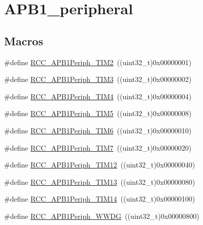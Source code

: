 \hypertarget{group___a_p_b1__peripheral}{}\section{A\+P\+B1\+\_\+peripheral}
\label{group___a_p_b1__peripheral}
\subsection*{Macros}
\begin{DoxyCompactItemize}
\item 
\#define \mbox{\hyperlink{group___a_p_b1__peripheral_ga742bab2f04cebe587574b53f7107aeaf}{R\+C\+C\+\_\+\+A\+P\+B1\+Periph\+\_\+\+T\+I\+M2}}~((uint32\+\_\+t)0x00000001)
\item 
\#define \mbox{\hyperlink{group___a_p_b1__peripheral_gad4454f63a511a256e55aad55c03beb76}{R\+C\+C\+\_\+\+A\+P\+B1\+Periph\+\_\+\+T\+I\+M3}}~((uint32\+\_\+t)0x00000002)
\item 
\#define \mbox{\hyperlink{group___a_p_b1__peripheral_ga80f9f3720804a97210b723696bd94d83}{R\+C\+C\+\_\+\+A\+P\+B1\+Periph\+\_\+\+T\+I\+M4}}~((uint32\+\_\+t)0x00000004)
\item 
\#define \mbox{\hyperlink{group___a_p_b1__peripheral_ga4905c26000a571fa01fc057fe31d254a}{R\+C\+C\+\_\+\+A\+P\+B1\+Periph\+\_\+\+T\+I\+M5}}~((uint32\+\_\+t)0x00000008)
\item 
\#define \mbox{\hyperlink{group___a_p_b1__peripheral_ga4974e8b8f11d54fbc0bac1988ff6254c}{R\+C\+C\+\_\+\+A\+P\+B1\+Periph\+\_\+\+T\+I\+M6}}~((uint32\+\_\+t)0x00000010)
\item 
\#define \mbox{\hyperlink{group___a_p_b1__peripheral_ga9415b0c46db5318bdee3f868c16b8d35}{R\+C\+C\+\_\+\+A\+P\+B1\+Periph\+\_\+\+T\+I\+M7}}~((uint32\+\_\+t)0x00000020)
\item 
\#define \mbox{\hyperlink{group___a_p_b1__peripheral_ga0a4ec40233160ca20adaa571073e7bcd}{R\+C\+C\+\_\+\+A\+P\+B1\+Periph\+\_\+\+T\+I\+M12}}~((uint32\+\_\+t)0x00000040)
\item 
\#define \mbox{\hyperlink{group___a_p_b1__peripheral_ga34397b722f46f31e898136fb51a7523a}{R\+C\+C\+\_\+\+A\+P\+B1\+Periph\+\_\+\+T\+I\+M13}}~((uint32\+\_\+t)0x00000080)
\item 
\#define \mbox{\hyperlink{group___a_p_b1__peripheral_ga7100c45768eea1484f6fd519b53e287d}{R\+C\+C\+\_\+\+A\+P\+B1\+Periph\+\_\+\+T\+I\+M14}}~((uint32\+\_\+t)0x00000100)
\item 
\#define \mbox{\hyperlink{group___a_p_b1__peripheral_gad84e40be78ddc40b8eae1c2b0898f6b1}{R\+C\+C\+\_\+\+A\+P\+B1\+Periph\+\_\+\+W\+W\+DG}}~((uint32\+\_\+t)0x00000800)

\end{DoxyCompactItemize}
